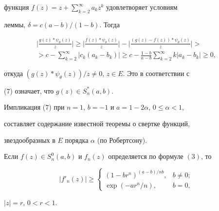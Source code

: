 \begin{pf}
функция $f(z)=z+\sum\limits^\infty_{k=2}a_k z^k$ удовлетворяет условиям 


леммы, $\delta=c(a-b)/(1-b)$. Тогда 


\begin{multline*} 


\biggl|\frac{g(z)*\psi_\theta(z)}{z} \biggr|\ge 


\biggl|\frac{f(z)*\psi_\theta(z)}{z} \biggr|- 


\biggl|\frac{(g(z)-f(z))*\psi_\theta(z)}{z} \biggr|> \\ 


>c-\sum^\infty_{k=2}|c_k(a_k-b_k)|\ge c-\frac{1-b}{a-b} 


\sum^\infty_{k=2}k|a_k-b_k|\ge 0, 


\end{multline*} 


откуда $(g(z)*\psi_\theta(z))/z\ne 0$, $z\in E$. Это в соответствии с 


(7) означает, что $g(z)\in S^*_n(a,b)$. 


\end{pf} 


 


\begin{notenonum} 


Импликация (7) при $n=1$, $b=-1$ и $a=1-2\alpha$, $0\le\alpha<1$, 


составляет содержание известной \cite{10} теоремы о свертке функций, 


звездообразных в $E$ порядка $\alpha$ (по Робертсону). 


\end{notenonum} 


 


\begin{lem} 


Если $f(z)\in S^0_n(a,b)$ и $f_n(z)$ определяется по формуле $(3)$, то 


\begin{equation} 


|f'_n(z)|\ge 


\begin{cases} 


(1-br^n)^{(a-b)/nb}, & b\ne 0;\\ 


\exp(-ar^n/n), & b=0, 


\end{cases} 


\end{equation} 


$|z|=r$, $0<r<1$. 


\end{lem} 


